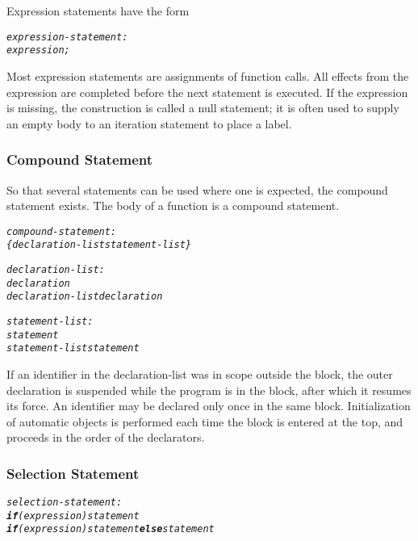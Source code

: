 \documentclass[12pt]{report}
\begin{document}
Expression statements have the form 

\begin{alltt}\begin{singlespace}
         \textit{expression-statement:}
              \textit{expression;}\end{singlespace}
\end{alltt}

Most expression statements are assignments of function calls. All effects from the expression are completed before the next statement is executed. If the expression is missing, the construction is called a null statement; it is often used to supply an empty body to an iteration statement to place a label.

\subsubsection{Compound Statement}

So that several statements can be used where one is expected, the compound statement exists. The body of a function is a compound statement.

\begin{alltt}\begin{singlespace}
         \textit{compound-statement:}
              \textit{\{ declaration-list statement-list \}}
              
         \textit{declaration-list:}
              \textit{declaration}
              \textit{declaration-list declaration}
              
         \textit{statement-list:}
              \textit{statement}
              \textit{statement-list statement}\end{singlespace}
\end{alltt}

If an identifier in the declaration-list was in scope outside the block, the outer declaration is suspended while the program is in the block, after which it resumes its force. An identifier may be declared only once in the same block. Initialization of automatic objects is performed each time the block is entered at the top, and proceeds in the order of the declarators. 

\subsubsection{Selection Statement}

\begin{alltt}\begin{singlespace}
         \textit{selection-statement:}
              \textit{\textbf{if} (expression) statement}
              \textit{\textbf{if} (expression) statement \textbf{else} statement}\end{singlespace}
\end{alltt}
\end{document}
